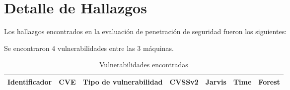 \documentclass[a4paper]{article}
\begin{document}
    \section{Detalle de Hallazgos}
        \large{Los hallazgos encontrados en la evaluación de penetración de seguridad fueron los siguientes:}
        \par
        \large{Se encontraron 4 vulnerabilidades entre las 3 máquinas.}
        \par
        \begin{table}[H]
            \centering
                \begin{tabular}{|c|c|c|c|c|c|c|}\hline
                    Identificador & CVE & Tipo de vulnerabilidad & CVSSv2 & Jarvis & Time & Forest \\ \hline
                    
                \end{tabular}
                \caption{Vulnerabilidades encontradas}
        \end{table}
        \par
        

    \clearpage
    
    
    \clearpage
\end{document}
